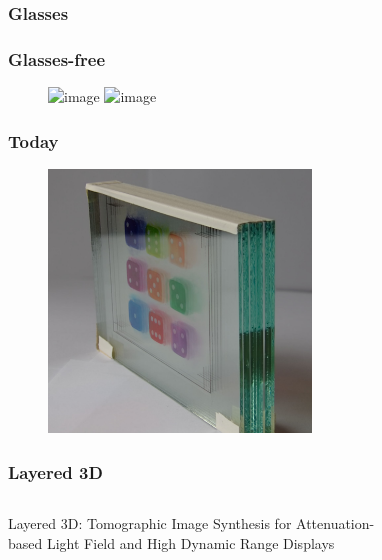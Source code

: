 \documentclass[12pt, compress]{beamer}
\begin{document}
\begin{frame}[fragile]
	\frametitle<1>{Glasses}
	\frametitle<2>{Glasses-free}
	
	\begin{figure}
		\includegraphics<1>[width=5cm]{figures/overview_displays/3d_glasses}
		\includegraphics<2>[width=5cm]{figures/overview_displays/no_3d_glasses}
	\end{figure}

\end{frame}

\begin{frame}[fragile]
	\frametitle{Today}
	
	\begin{figure}
		\includegraphics[height=7cm]{images/glass_plates_front_view_cropped}
	\end{figure}
\end{frame}

\begin{frame}[fragile]
	\frametitle{Layered 3D}

	\begin{columns}[onlytextwidth]
			\begin{block}{}
				Layered 3D: Tomographic Image Synthesis for Attenuation-based Light Field and High Dynamic Range Displays
			\end{block}
			\begin{block}{}
				\cite{WetzsteinTomo}
			\end{block}
			\begin{figure}
			\end{figure}
	\end{columns}
	
\end{frame}
\end{document}
